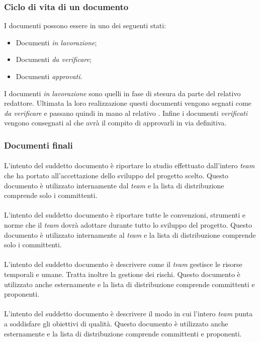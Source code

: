 \subsubsection{Ciclo di vita di un documento}
 I documenti possono essere in uno dei seguenti stati:
\begin{itemize}
  \item Documenti \textit{in lavorazione};
  \item Documenti \textit{da verificare};
  \item Documenti \textit{approvati}.
\end{itemize}
I documenti \textit{in lavorazione} sono quelli in fase di stesura da parte del
relativo redattore. Ultimata la loro realizzazione questi documenti vengono
segnati come \textit{da verificare} e passano quindi in mano al relativo
\textit{\Ver}. Infine i documenti \textit{verificati} vengono consegnati al \textit{\RdP}
che avrà il compito di approvarli in via definitiva.
\subsubsection{Documenti finali}
\paragraph{\SdF}
L'intento del suddetto documento è riportare lo studio effettuato dall'intero
\textit{team} che ha portato all'accettazione dello sviluppo del progetto scelto. Questo
documento è utilizzato internamente dal \textit{team} e la lista di distribuzione comprende solo i committenti.
\paragraph{\NdP}
L'intento del suddetto documento è riportare tutte le convenzioni, strumenti e
norme che il \textit{team} dovrà adottare durante tutto lo sviluppo del progetto. Questo
documento è utilizzato internamente al \textit{team} e la lista di distribuzione comprende solo i committenti.
\paragraph{\PdP}
L'intento del suddetto documento è descrivere come il \textit{team} gestisce le risorse
temporali e umane. Tratta inoltre la gestione dei rischi. Questo documento è
utilizzato anche esternamente e la lista di distribuzione comprende committenti
e proponenti.
\paragraph{\PdQ}
L'intento del suddetto documento è descrivere il modo in cui l'intero \textit{team} punta
a soddisfare gli obiettivi di qualità. Questo documento è
utilizzato anche esternamente e la lista di distribuzione comprende committenti
e proponenti.
